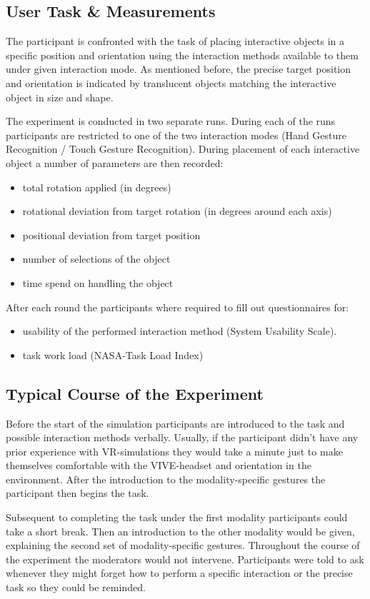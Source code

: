 \subsection{User Task \& Measurements}
The participant is confronted with the task of placing interactive objects in a specific position and orientation using the interaction methods available to them under given interaction mode.
As mentioned before, the precise target position and orientation is indicated by translucent objects matching the interactive object in size and shape.

The experiment is conducted in two separate runs.
During each of the runs participants are restricted to one of the two interaction modes (Hand Gesture Recognition / Touch Gesture Recognition). During placement of each interactive object a number of parameters are then recorded:
\begin{itemize}
\item total rotation applied (in degrees)
\item rotational deviation from target rotation (in degrees around each axis)
\item positional deviation from target position
\item number of selections of the object
\item time spend on handling the object
\end{itemize}
After each round the participants where required to fill out questionnaires for:
\begin{itemize}
\item usability of the performed interaction method (System Usability Scale).
\item task work load (NASA-Task Load Index)
\end{itemize}


\subsection{Typical Course of the Experiment}
Before the start of the simulation participants are introduced to the task and possible interaction methods verbally.
Usually, if the participant didn't have any prior experience with VR-simulations they would take a minute just to make themselves comfortable with the VIVE-headset and orientation in the environment.
After the introduction to the modality-specific gestures the participant then begins the task.

Subsequent to completing the task under the first modality participants could take a short break.
Then an introduction to the other modality would be given, explaining the second set of modality-specific gestures.
Throughout the course of the experiment the moderators would not intervene.
Participants were told to ask whenever they might forget how to perform a specific interaction or the precise task so they could be reminded.